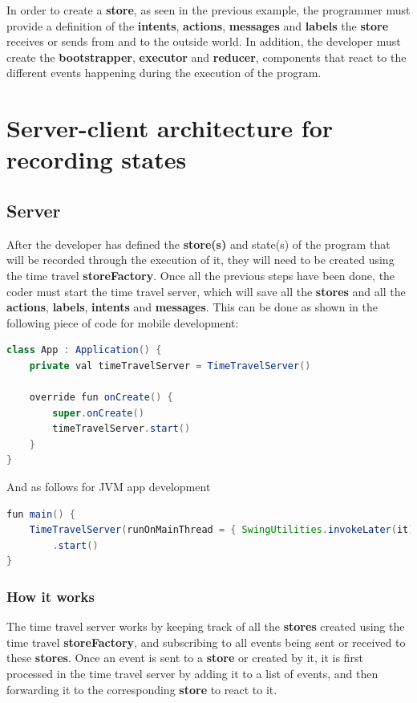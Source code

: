 In order to create a \textbf{store}, as seen in the previous example, the programmer must provide a definition of the \textbf{intents}, \textbf{actions}, \textbf{messages} and \textbf{labels} the \textbf{store} receives or sends from and to the outside world. In addition, the developer must create the \textbf{bootstrapper}, \textbf{executor} and \textbf{reducer}, components that react to the different events happening during the execution of the program.

\section{Server-client architecture for recording states}

\subsection{Server}

After the developer has defined the \textbf{store(s)} and state(s) of the program that will be recorded through the execution of it, they will need to be created using the time travel \textbf{storeFactory}. Once all the previous steps have been done, the coder must start the time travel server, which will save all the \textbf{stores} and all the \textbf{actions}, \textbf{labels}, \textbf{intents} and \textbf{messages}. This can be done as shown in the following piece of code for mobile development:

\begin{lstlisting}[language=java]
class App : Application() {
    private val timeTravelServer = TimeTravelServer()

    override fun onCreate() {
        super.onCreate()
        timeTravelServer.start()
    }
}
\end{lstlisting}
 
And as follows for JVM app development
\begin{lstlisting}[language=java]
fun main() {
    TimeTravelServer(runOnMainThread = { SwingUtilities.invokeLater(it) })
        .start()
}
\end{lstlisting}

\subsubsection{How it works}

The time travel server works by keeping track of all the \textbf{stores} created using the time travel \textbf{storeFactory}, and subscribing to all events being sent or received to these \textbf{stores}. Once an event is sent to a \textbf{store} or created by it, it is first processed in the time travel server by adding it to a list of events, and then forwarding it to the corresponding \textbf{store} to react to it.

